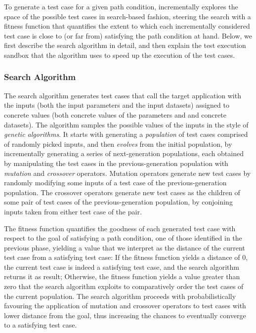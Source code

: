 To generate a test case for a given path condition,  \approach incrementally explores the space of the possible test cases in search-based fashion, steering the search with a fitness function that quantifies the extent to which each incrementally considered test case is close to (or far from) satisfying the path condition at hand. Below, we first describe the \approach search algorithm in detail, and then explain the 
test execution sandbox that the algorithm uses to speed up the execution of the test cases. 

\subsubsection{Search Algorithm}
The \approach search algorithm generates test cases that call the target application with 
the inputs (both the input parameters and the input datasets) assigned to concrete values (both concrete values of the parameters and and concrete datasets). 
The algorithm samples the possible values of the inputs in the style of \emph{genetic algorithms}. It starts with generating a \emph{population} of test cases comprised of randomly picked inputs, and then \emph{evolves} from the initial population, by incrementally generating a series of next-generation populations, each obtained 
by manipulating the test cases in the previous-generation population with \emph{mutation} and \emph{crossover} operators. 
Mutation operators generate new test cases by randomly modifying some inputs of a test case of the previous-generation population. The crossover operators generate new test cases as the children of some pair of test cases of the previous-generation population, by conjoining inputs taken from either test case of the pair. 

The \approach fitness function quantifies the goodness of each generated test case with respect to the goal of satisfying a path condition, one of those identified in the previous phase, yielding a value that we interpret as the distance of the current test case from a satisfying test case: If the fitness function yields a distance of 0, the current test case is indeed a satisfying test case, and the search algorithm returns it as result; Otherwise, the fitness function yields a value greater than zero that the search algorithm exploits to comparatively order the test cases of the current population.  The search algorithm proceeds with probabilistically favouring the application of mutation and crossover operators to 
test cases with lower distance from the goal, thus increasing the chances to eventually converge to a satisfying test case. 

